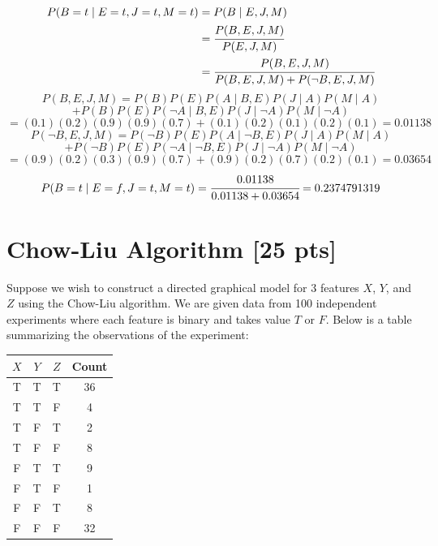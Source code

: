 \documentclass[a4paper]{article}
\theoremstyle{definition}
\newenvironment{soln}{
	\leavevmode\color{blue}\ignorespaces
}{}
\begin{document}
\begin{soln}
\begin{equation*}
\begin{split}
P(B=t \mid E=t,J=t,M=t) &= P(B \mid E,J,M) \\
&= \cfrac{P(B, E, J, M)}{P( E, J, M)} \\
&= \cfrac{P(B, E, J, M)}{P(B, E, J, M) + P(\neg B, E, J, M)} \\
\end{split}
\end{equation*}
$$P(B, E, J, M) = P(B)P(E) P(A \mid B, E)P(J \mid A)P(M \mid A)$$
$$+ P(B)P( E) P(\neg A \mid B, E)P(J \mid \neg A)P(M \mid \neg A)$$
$$= (0.1)(0.2)(0.9)(0.9)(0.7) + (0.1)(0.2)(0.1)(0.2)(0.1) = 0.01138$$
$$P(\neg B, E, J, M) = P(\neg B)P(E) P(A \mid \neg B, E)P(J \mid A)P(M \mid A)$$
$$+ P(\neg B)P(E) P(\neg A \mid \neg B, E)P(J \mid \neg A)P(M \mid \neg A)$$
$$= (0.9)(0.2)(0.3)(0.9)(0.7) + (0.9)(0.2)(0.7)(0.2)(0.1) = 0.03654$$
$$P(B=t \mid E=f,J=t,M=t) = \cfrac{0.01138}{0.01138 + 0.03654} = 0.2374791319$$
\end{soln}

\newpage
\section{Chow-Liu Algorithm [25 pts]}
Suppose we wish to construct a directed graphical model for 3 features $X$, $Y$, and $Z$ using the Chow-Liu algorithm. We are given data from 100 independent experiments where each feature is binary and takes value $T$ or $F$. Below is a table summarizing the observations of the experiment:

\begin{table}[H]
        \centering
                \begin{tabular}{cccc}
                           $X$ & $Y$ & $Z$ & Count \\
                                \hline
                                T & T & T & 36 \\
                                \hline
                                T & T & F & 4 \\
                                \hline
                                T & F & T & 2 \\
                                \hline
                                T & F & F & 8 \\
                                \hline
                                F & T & T & 9 \\
                                \hline
                                F & T & F & 1 \\
                                \hline
                                F & F & T & 8 \\
                                \hline
                                F & F & F & 32 \\
                                \hline
                \end{tabular}
\end{table}
\end{document}
